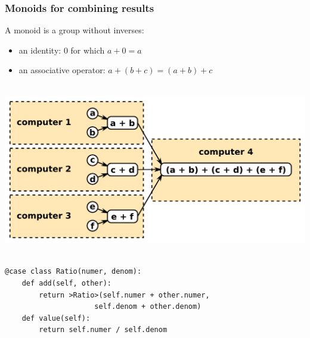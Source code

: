 \documentclass[compress]{beamer}
\begin{document}
\begin{frame}[fragile]
\frametitle{Monoids for combining results}

A monoid is a group without inverses:
\begin{itemize}
\item an identity: $0$ for which $a + 0 = a$
\item an associative operator: $a + (b + c) = (a + b) + c$
\end{itemize}

\vspace{0.2 cm}
\mbox{ } \hfill \includegraphics[width=0.7\linewidth]{PLOTS/monoids.png} \hfill \mbox{ }

\vspace{0.2 cm}
\begin{lstlisting}
@case class Ratio(numer, denom):
    def add(self, other):
        return >Ratio>(self.numer + other.numer,
                     self.denom + other.denom)
    def value(self):
        return self.numer / self.denom
\end{lstlisting}
\end{frame}
\end{document}
